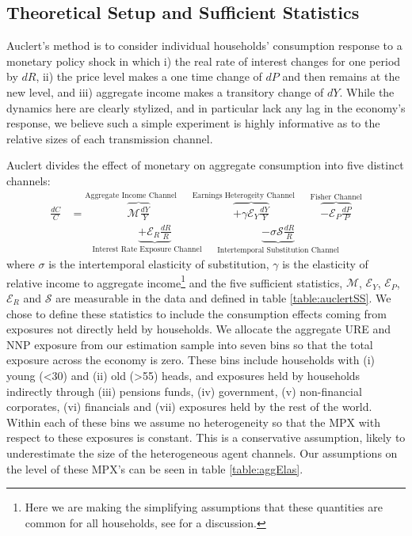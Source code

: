 \documentclass[titlepage]{\econtex}\newcommand{\texname}{ConsumptionHeterogeneity}
\begin{document}
\subsection{Theoretical Setup and Sufficient Statistics}
Auclert's method is to consider individual households' consumption response to a monetary policy shock in which i) the real rate of interest changes for one period by $dR$, ii) the price level makes a one time change of $dP$ and then remains at the new level, and iii) aggregate income makes a transitory change of $dY$. While the dynamics here are clearly stylized, and in particular lack any lag in the economy's response, we believe such a simple experiment is highly informative as to the relative sizes of each transmission channel.

Auclert divides the effect of monetary on aggregate consumption into five distinct channels:
\begin{align} 
\frac{dC}{C} &= \overbrace{\mathcal{M}\frac{dY}{Y}}^{\text{Aggregate Income Channel}\qquad} \overbrace{ + \gamma \mathcal{E}_Y \frac{dY}{Y}}^{\text{Earnings Heterogeity Channel}\qquad} \overbrace{ - \mathcal{E}_P\frac{dP}{P}}^{\text{Fisher Channel}}  \nonumber \\
& \qquad \underbrace{ + \mathcal{E}_R \frac{dR}{R}}_{\text{Interest Rate Exposure Channel}\qquad}  \underbrace{ - \sigma \mathcal{S}\frac{dR}{R}}_{\text{Intertemporal Substitution Channel}} \label{auclert_channels}
\end{align}
where $\sigma$ is the intertemporal elasticity of substitution, $\gamma$ is the elasticity of relative income to aggregate income\footnote{Here we are making the simplifying assumptions that these quantities are common for all households, see \cite{auclert_monetary_2017} for a discussion.} and the five sufficient statistics, $\mathcal{M}$, $\mathcal{E}_Y$, $\mathcal{E}_P$, $\mathcal{E}_R$ and $\mathcal{S}$ are measurable in the data and defined in table \ref{table:auclertSS}. We chose to define these statistics to include the consumption effects coming from exposures not directly held by households. We allocate the aggregate URE and NNP exposure from our estimation sample into seven bins so that the total exposure across the economy is zero. These bins include households with (i) young (<30) and (ii) old (>55) heads, and exposures held by households indirectly through (iii) pensions funds, (iv) government, (v) non-financial corporates, (vi) financials and (vii) exposures held by the rest of the world. Within each of these bins we assume no heterogeneity so that the MPX with respect to these exposures is constant. This is a conservative assumption, likely to underestimate the size of the heterogeneous agent channels. Our assumptions on the level of these MPX's can be seen in table \ref{table:aggElas}.
\end{document}
